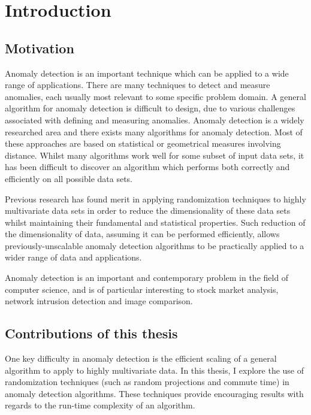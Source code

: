 \chapter{Introduction}
\label{ch:intro}

\section{Motivation}
\label{sec:motivation}
Anomaly detection is an important technique which can be applied to a wide 
range of applications. There are many techniques to detect and measure 
anomalies, each usually most relevant to some specific problem domain. A general
algorithm for anomaly detection is difficult to design, due to various 
challenges associated with defining and measuring anomalies. Anomaly detection 
is a widely researched area and there exists many algorithms for anomaly 
detection. Most of these approaches are based on statistical or geometrical 
measures involving distance. Whilst many algorithms work well for some subset of
input data sets, it has been difficult to discover an algorithm which performs 
both correctly and efficiently on all possible data sets.

Previous research has found merit in applying randomization techniques to highly
multivariate data sets in order to reduce the dimensionality of these data sets 
whilst maintaining their fundamental and statistical properties. Such reduction 
of the dimensionality of data, assuming it can be performed efficiently, allows 
previously-unscalable anomaly detection algorithms to be practically applied to 
a wider range of data and applications.

Anomaly detection is an important and contemporary problem in the field of 
computer science, and is of particular interesting to stock market analysis, 
network intrusion detection and image comparison.

\section{Contributions of this thesis}
\label{sec:contributions}
One key difficulty in anomaly detection is the efficient scaling of a general 
algorithm to apply to highly multivariate data. In this thesis, I explore the 
use of randomization techniques (such as random projections and commute time) 
in anomaly detection algorithms. These techniques provide encouraging results 
with regards to the run-time complexity of an algorithm.

